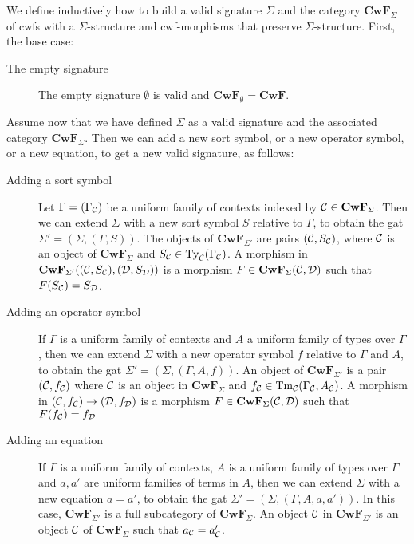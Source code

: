 \documentclass{lmcs}
\def\D{\mathcal{D}}
\def\Cwf{\mathbf{CwF}}
\begin{document}
\begin{definition}\label{def-sig-mod}
We define inductively how to build a valid signature $\Sigma$ and the category $\Cwf_\Sigma$ of cwfs with a $\Sigma$-structure and cwf-morphisms that preserve $\Sigma$-structure. First, the base case:
\begin{description}
\item[The empty signature] The empty signature $\emptyset$ is valid and $\Cwf_\emptyset = \Cwf$.
\end{description}
Assume now that we have defined $\Sigma$ as a valid signature and the associated
category $\Cwf_{\Sigma}$.
Then we can add a new sort symbol, or a new operator symbol, or a new equation, to get a new valid signature,
as follows:
\begin{description}
\item[Adding a sort symbol]
  Let $\Gamma = (\Gamma_{\mathcal C})$ be a uniform family of contexts indexed by $\C \in \Cwf_{\Sigma}$.
  Then we can extend $\Sigma$ with a new sort symbol $S$ relative to $\Gamma$, to obtain
  the gat $\Sigma' = (\Sigma,(\Gamma,S))$.
  The objects of $\Cwf_{\Sigma'}$ are pairs $({\mathcal C},S_{{\mathcal C}})$, where ${\mathcal C}$ is an object of $\Cwf_{\Sigma}$
  and $S_{{\mathcal C}} \in \mathrm{Ty}_{\mathcal C}(\Gamma_{{\mathcal C}})$.
  A morphism in $\Cwf_{\Sigma'}((\C,S_{\C}), (\D,S_{\D}))$
  is a morphism $F \in \Cwf_{\Sigma}(\C,\D)$ such that $F(S_\C) = S_\D$.
\item[Adding an operator symbol]
  If $\Gamma$ is a uniform family of contexts and $A$ a uniform family of
  types over $\Gamma$, 
  then we can extend $\Sigma$ with a new operator
  symbol $f$ relative to $\Gamma$ and $A$, to obtain
  the gat $\Sigma' = (\Sigma,(\Gamma,A,f))$.
  An object of $\Cwf_{\Sigma'}$
  is a pair $({\mathcal C},f_{{\mathcal C}})$ where ${\mathcal C}$ is an object in $\Cwf_{\Sigma}$ and $f_{{\mathcal C}} \in \mathrm{Tm}_{\mathcal C}(\Gamma_{\mathcal C},A_{\mathcal C})$.
  A morphism in $(\C,f_{\C}) \to (\D,f_{\D})$ is a morphism $F \in \Cwf_{\Sigma}(\C,\D)$ such that $F(f_{\C}) = f_{\D}$
\item[Adding an equation]
  If $\Gamma$ is a uniform family of contexts,
  $A$ is a uniform family of types over $\Gamma$
  and $a,a'$ are uniform families of terms in $A$, 
  then we can extend $\Sigma$ with a new equation $a = a'$, to obtain
  the gat $\Sigma' = (\Sigma,(\Gamma,A,a,a'))$.
  In this case,
  $\Cwf_{\Sigma'}$ is a full subcategory of $\Cwf_{\Sigma}$. An object ${\mathcal C}$ in
  $\Cwf_{\Sigma'}$ is an object ${\mathcal C}$ of $\Cwf_\Sigma$ such that $a_{{\mathcal C}} = a'_{{\mathcal C}}$.
\end{description}

\end{definition}
\end{document}

